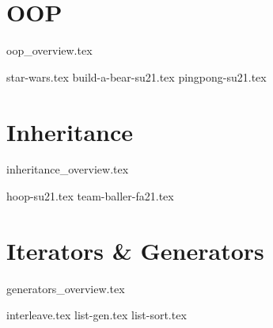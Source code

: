 \documentclass{exam}
\begin{document}
\section{OOP}
{oop_overview.tex}
\newpage
\begin{questions}
{star-wars.tex}
\newpage
{build-a-bear-su21.tex}
{pingpong-su21.tex}
\end{questions}

\newpage
\section{Inheritance}
{inheritance_overview.tex}
\begin{questions}
{hoop-su21.tex}
{team-baller-fa21.tex}
\end{questions}

\newpage
\section{Iterators \& Generators}
{generators_overview.tex}
\begin{questions}
{interleave.tex}
\newpage
{list-gen.tex}
\newpage
{list-sort.tex}
\end{questions}
\end{document}
